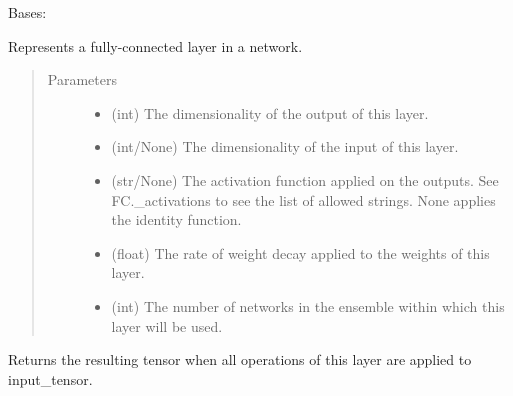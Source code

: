 \documentclass[letterpaper,10pt,english,openany,oneside]{sphinxmanual}
\begin{document}
\begin{fulllineitems}
\label{\detokenize{_modules/layers:layers.FC.FC}}
Bases: 

Represents a fully-connected layer in a network.
\begin{quote}\begin{description}
\item[{Parameters}] \leavevmode\begin{itemize}
\item {} 
 \textendash{} (int) The dimensionality of the output of this layer.

\item {} 
 \textendash{} (int/None) The dimensionality of the input of this layer.

\item {} 
 \textendash{} (str/None) The activation function applied on the outputs.
See FC.\_activations to see the list of allowed strings.
None applies the identity function.

\item {} 
 \textendash{} (float) The rate of weight decay applied to the weights of this layer.

\item {} 
 \textendash{} (int) The number of networks in the ensemble within which this layer will be used.

\end{itemize}

\end{description}\end{quote}

\begin{fulllineitems}
\label{\detokenize{_modules/layers:layers.FC.FC.compute_output_tensor}}
Returns the resulting tensor when all operations of this layer are applied to input\_tensor.


\end{fulllineitems}
\end{fulllineitems}
\end{document}
